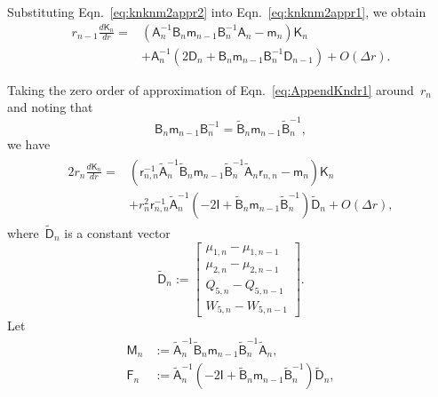 \documentclass[preprint,10pt,times]{elsarticle}
\numberwithin{equation}{section}
\renewcommand{\u}[1]{\boldsymbol{#1}}
\newcommand{\usf}[1]{\u{\mathsf #1}}
\renewcommand{\>}{$\Rightarrow$}
\begin{document}
Substituting Eqn.~\eqref{eq:knknm2appr2} into Eqn.~\eqref{eq:knknm2appr1}, we obtain
\begin{equation}
	\begin{aligned}
		r_{n-1} \frac{d \usf{K}_n}{dr} = & \left( \usf{A}^{-1}_n \usf{B}_n \usf{m}_{n-1} \usf{B}^{-1}_n \usf{A}_n - \usf{m}_n \right) \usf{K}_n \\
		& + \usf{A}^{-1}_n \left( 2\usf{D}_n + \usf{B}_n \usf{m}_{n-1} \usf{B}^{-1}_n \usf{D}_{n-1} \right) + O(\Delta r).
	\end{aligned}
	\label{eq:AppendKndr1}
\end{equation}

Taking the zero order of approximation of Eqn.~\eqref{eq:AppendKndr1} around~$r_n$ and noting that
\begin{equation}
	\usf{B}_n \usf{m}_{n-1} \usf{B}^{-1}_n = \tilde{\usf{B}}_n \usf{m}_{n-1} \tilde{\usf{B}}^{-1}_n,
\end{equation}
we have
\begin{equation}
\begin{aligned}
	\begin{split}
	2 r_{n} \frac{d \usf{K}_n}{dr} = & \left( \usf{r}_{n,n}^{-1} \tilde{\usf{A}}^{-1}_n \tilde{\usf{B}}_n \usf{m}_{n-1} \tilde{\usf{B}}^{-1}_n \tilde{\usf{A}}_n \usf{r}_{n,n} - \usf{m}_n \right) \usf{K}_n \\
	& + r_n^2 \usf{r}^{-1}_{n,n} \tilde{\usf{A}}^{-1}_n \left( -2\usf{I} + \tilde{\usf{B}}_n \usf{m}_{n-1} \tilde{\usf{B}}^{-1}_n \right) \tilde{\usf{D}}_n + O(\Delta r),
	\end{split}
\end{aligned}
\label{eq:AppendKndr2}
\end{equation}
where~$\tilde{\usf{D}}_{n}$ is a constant vector
\begin{equation}
	\tilde{\usf{D}}_n
	:=
	\begin{bmatrix}
		\mu_{1,n}-\mu_{1,n-1} \\ \mu_{2,n}-\mu_{2,n-1}  \\ Q_{5,n}-Q_{5,n-1} \\ W_{5,n}-W_{5,n-1}
	\end{bmatrix} .
\end{equation}
Let
\begin{subequations}
	\begin{align}
	\usf{M}_n & := \tilde{\usf{A}}^{-1}_n \tilde{\usf{B}}_n \usf{m}_{n-1} \tilde{\usf{B}}^{-1}_n \tilde{\usf{A}}_n, \\
	\usf{F}_n & := \tilde{\usf{A}}^{-1}_n \left( -2\usf{I} + \tilde{\usf{B}}_n \usf{m}_{n-1} \tilde{\usf{B}}^{-1}_n \right) \tilde{\usf{D}}_n,
	\end{align}
\end{subequations}
\end{document}
